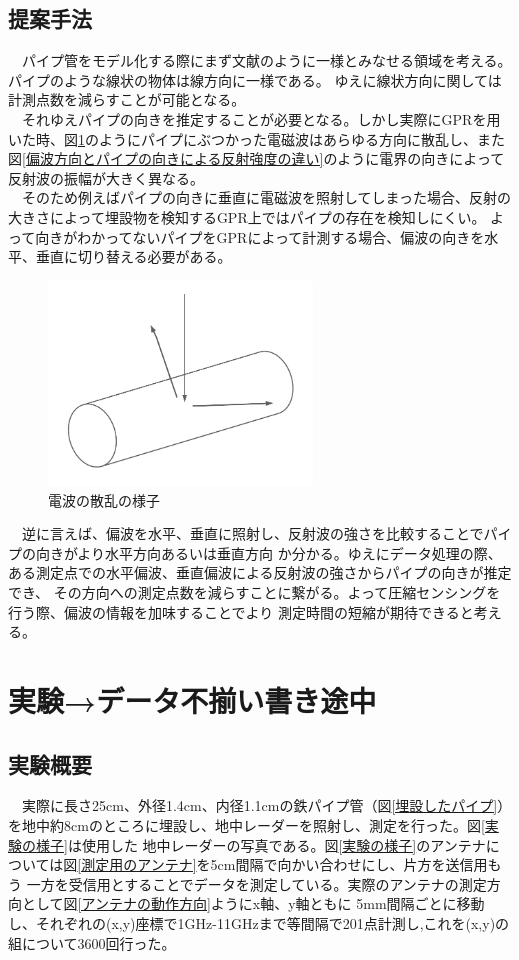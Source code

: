 \documentclass[a4paper,12pt]{jsreport}
\begin{document}
\section{提案手法}
　パイプ管をモデル化する際にまず文献\cite{imai}のように一様とみなせる領域を考える。パイプのような線状の物体は線方向に一様である。
ゆえに線状方向に関しては計測点数を減らすことが可能となる。
\\　それゆえパイプの向きを推定することが必要となる。しかし実際にGPRを用いた時、図\ref{電波の散乱の様子}のようにパイプにぶつかった電磁波はあらゆる方向に散乱し、また
図\ref{偏波方向とパイプの向きによる反射強度の違い}のように電界の向きによって反射波の振幅が大きく異なる。
\\　そのため例えばパイプの向きに垂直に電磁波を照射してしまった場合、反射の大きさによって埋設物を検知するGPR上ではパイプの存在を検知しにくい。
よって向きがわかってないパイプをGPRによって計測する場合、偏波の向きを水平、垂直に切り替える必要がある。

\begin{figure}[h]
  \begin{center}
   \includegraphics[width=7cm]{./image/scattering.pdf}
  \caption{電波の散乱の様子}\label{電波の散乱の様子}
  \end{center}
  \end{figure}

　逆に言えば、偏波を水平、垂直に照射し、反射波の強さを比較することでパイプの向きがより水平方向あるいは垂直方向
か分かる。ゆえにデータ処理の際、ある測定点での水平偏波、垂直偏波による反射波の強さからパイプの向きが推定でき、
その方向への測定点数を減らすことに繋がる。よって圧縮センシングを行う際、偏波の情報を加味することでより
測定時間の短縮が期待できると考える。

\chapter{実験→データ不揃い書き途中}
\section{実験概要}
　実際に長さ25cm、外径1.4cm、内径1.1cmの鉄パイプ管（図\ref{埋設したパイプ}）を地中約8cmのところに埋設し、地中レーダーを照射し、測定を行った。図\ref{実験の様子}は使用した
地中レーダーの写真である。図\ref{実験の様子}のアンテナについては図\ref{測定用のアンテナ}を5cm間隔で向かい合わせにし、片方を送信用もう
一方を受信用とすることでデータを測定している。実際のアンテナの測定方向として図\ref{アンテナの動作方向}ようにx軸、y軸ともに
5mm間隔ごとに移動し、それぞれの(x,y)座標で1GHz-11GHzまで等間隔で201点計測し,これを(x,y)の組について3600回行った。
\end{document}
